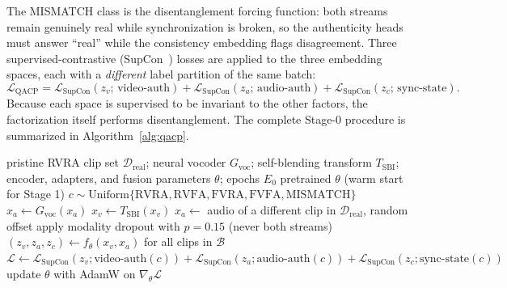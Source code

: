 The MISMATCH class is the disentanglement forcing function: both streams remain
genuinely real while synchronization is broken, so the authenticity heads must
answer ``real'' while the consistency embedding flags disagreement. Three
supervised-contrastive (SupCon~\cite{khosla2020supcon}) losses are applied to
the three embedding spaces, each with a \emph{different} label partition of the
same batch:
\begin{equation}
\mathcal{L}_{\text{QACP}} =
  \mathcal{L}_{\text{SupCon}}(z_v;\, \text{video-auth}) +
  \mathcal{L}_{\text{SupCon}}(z_a;\, \text{audio-auth}) +
  \mathcal{L}_{\text{SupCon}}(z_c;\, \text{sync-state}).
\end{equation}
Because each space is supervised to be invariant to the other factors, the
factorization itself performs disentanglement. The complete Stage-0
procedure is summarized in Algorithm~\ref{alg:qacp}.

\begin{algorithm}[htbp]
\caption{Quadrant-Aware Contrastive Pretraining (Stage 0)}
\label{alg:qacp}
\begin{algorithmic}[1]
\Require pristine RVRA clip set $\mathcal{D}_{\text{real}}$; neural vocoder
  $G_{\text{voc}}$; self-blending transform $T_{\text{SBI}}$; encoder,
  adapters, and fusion parameters $\theta$; epochs $E_0$
\Ensure pretrained $\theta$ (warm start for Stage 1)
      \State $c \sim \mathrm{Uniform}\{\text{RVRA}, \text{RVFA}, \text{FVRA},
        \text{FVFA}, \text{MISMATCH}\}$
        \State $x_a \gets G_{\text{voc}}(x_a)$
      \EndIf
        \State $x_v \gets T_{\text{SBI}}(x_v)$
      \EndIf
        \State $x_a \gets$ audio of a different clip in
          $\mathcal{D}_{\text{real}}$, random offset
      \EndIf
    \EndFor
    \State apply modality dropout with $p = 0.15$ (never both streams)
    \State $(z_v, z_a, z_c) \gets f_\theta(x_v, x_a)$ for all clips in $\mathcal{B}$
    \State $\mathcal{L} \gets
      \mathcal{L}_{\text{SupCon}}(z_v; \text{video-auth}(c)) +
      \mathcal{L}_{\text{SupCon}}(z_a; \text{audio-auth}(c)) +
      \mathcal{L}_{\text{SupCon}}(z_c; \text{sync-state}(c))$
    \State update $\theta$ with AdamW on $\nabla_\theta \mathcal{L}$
  \EndFor
\EndFor
\end{algorithmic}
\end{algorithm}

